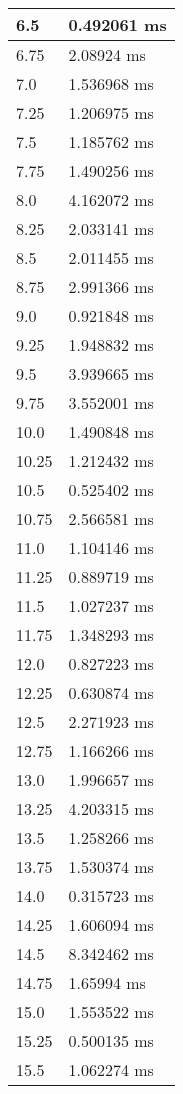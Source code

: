 \begin{multicols}{2}
\begin{tabular}{|l|l|}
		6.5 & 0.492061 ms \\ \hline
		6.75 & 2.08924 ms \\ \hline
		7.0 & 1.536968 ms \\ \hline
		7.25 & 1.206975 ms \\ \hline
		7.5 & 1.185762 ms \\ \hline
		7.75 & 1.490256 ms \\ \hline
		8.0 & 4.162072 ms \\ \hline
		8.25 & 2.033141 ms \\ \hline
		8.5 & 2.011455 ms \\ \hline
		8.75 & 2.991366 ms \\ \hline
		9.0 & 0.921848 ms \\ \hline
		9.25 & 1.948832 ms \\ \hline
		9.5 & 3.939665 ms \\ \hline
		9.75 & 3.552001 ms \\ \hline
		10.0 & 1.490848 ms \\ \hline
		10.25 & 1.212432 ms \\ \hline
		10.5 & 0.525402 ms \\ \hline
		10.75 & 2.566581 ms \\ \hline
		11.0 & 1.104146 ms \\ \hline
		11.25 & 0.889719 ms \\ \hline
		11.5 & 1.027237 ms \\ \hline
		11.75 & 1.348293 ms \\ \hline
		12.0 & 0.827223 ms \\ \hline
		12.25 & 0.630874 ms \\ \hline
		12.5 & 2.271923 ms \\ \hline
		12.75 & 1.166266 ms \\ \hline
		13.0 & 1.996657 ms \\ \hline
		13.25 & 4.203315 ms \\ \hline
		13.5 & 1.258266 ms \\ \hline
		13.75 & 1.530374 ms \\ \hline
		14.0 & 0.315723 ms \\ \hline
		14.25 & 1.606094 ms \\ \hline
		14.5 & 8.342462 ms \\ \hline
		14.75 & 1.65994 ms \\ \hline
		15.0 & 1.553522 ms \\ \hline
		15.25 & 0.500135 ms \\ \hline
		15.5 & 1.062274 ms \\ \hline

\end{tabular}
\end{multicols}
